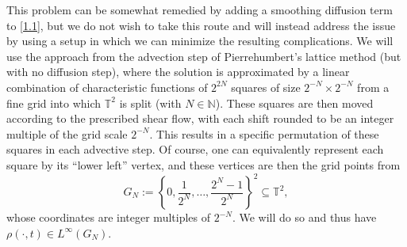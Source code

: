 \documentclass[12pt]{article}
\numberwithin{figure}{section}
\numberwithin{equation}{section}
\newcommand{\beq}{\begin{equation}}
\newcommand{\eeq}{\end{equation}}
\newcommand{\lb}{\label}
\newcommand{\bbN}{{\mathbb{N}}}
\newcommand{\bbT}{{\mathbb{T}}}
\begin{document}
This problem can be somewhat remedied by adding a smoothing diffusion term to \eqref{1.1}, 
but we do not wish to take this route and will instead address the issue by using a setup in which we can minimize the resulting complications.  We will use the approach from the advection step of Pierrehumbert's lattice method \cite{Pie2} (but with no diffusion step), where the solution is approximated by a linear combination of characteristic functions of $2^{2N}$ squares of size $2^{-N}\times 2^{-N}$ from a fine grid into which $\bbT^2$ is split (with $N\in\bbN$).  These squares are then moved according to the prescribed shear flow, with each shift rounded to be an integer multiple of the grid scale $2^{-N}$.  This results in a specific permutation of these squares in each advective step.  Of course, one can equivalently represent each square by its ``lower left'' vertex, and these vertices are then the grid points from
\beq \lb{1.5}
G_N:= \left\{ 0, \frac 1{2^N},\dots,\frac {2^N-1}{2^N} \right\}^2 \subseteq\bbT^2,
\eeq
 whose coordinates are integer multiples of $2^{-N}$.   We will do so and thus have $\rho(\cdot, t)\in L^\infty(G_N)$.
\end{document}

